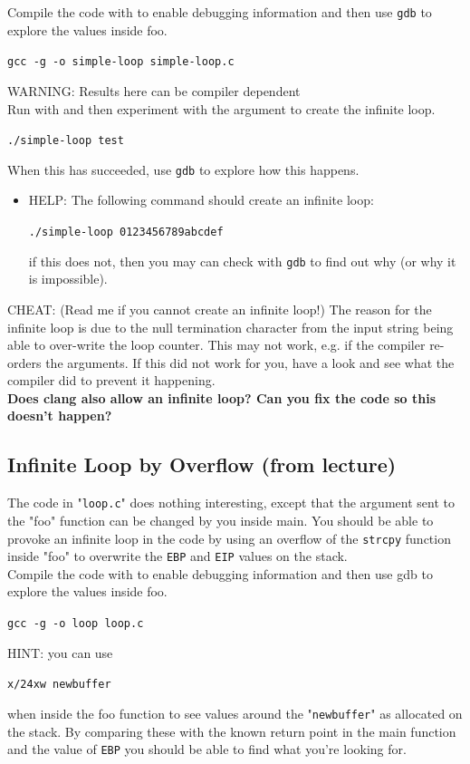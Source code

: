 \documentclass{article}
\begin{document}
\noindent Compile the code with to enable debugging information and then use \lstinline{gdb} to explore the values inside
foo.
\begin{center}
    \lstinline{gcc -g -o simple-loop simple-loop.c}
\end{center}
\noindent WARNING: Results here can be compiler dependent\\

\noindent Run with and then experiment with the argument to create the infinite loop.
\begin{center}
    \lstinline{./simple-loop test}
\end{center}
\noindent When this has succeeded, use \lstinline{gdb} to explore how this happens.
\begin{itemize}
    \item HELP: The following command should create an infinite loop:
    \begin{center}
        \lstinline{./simple-loop 0123456789abcdef}
    \end{center}
    if this does not, then you may can check with \lstinline{gdb} to find out why (or why it is impossible).
\end{itemize}
\noindent CHEAT: (Read me if you cannot create an infinite loop!) The reason
for the infinite loop is due to the null termination character from the input
string being able to over-write the loop counter. This may not work, e.g. if
the compiler re-orders the arguments. If this did not work for you, have a
look and see what the compiler did to prevent it happening.\\

\noindent \textbf{Does clang also allow an infinite loop? Can you fix the code
so this doesn't happen?}
\subsection{Infinite Loop by Overflow (from lecture)}
The code in "\lstinline{loop.c}" does nothing interesting, except that the argument
sent to the "foo" function can be changed by you inside main. You should be
able to provoke an infinite loop in the code by using an overflow of the \lstinline{strcpy} function inside "foo" to overwrite the \lstinline{EBP} and \lstinline{EIP} values on the stack.\\

\noindent Compile the code with to enable debugging information and then use gdb to explore the values inside foo.
\begin{center}
    \lstinline{gcc -g -o loop loop.c}
\end{center}
\noindent HINT: you can use
\begin{center}
    \lstinline{x/24xw newbuffer}
\end{center}
\noindent when inside the foo function to see values around the "\lstinline{newbuffer}" as allocated on the stack. By comparing these with the known return point in the main
function and the value of \lstinline{EBP} you should be able to find what you're looking for.\\
\end{document}
